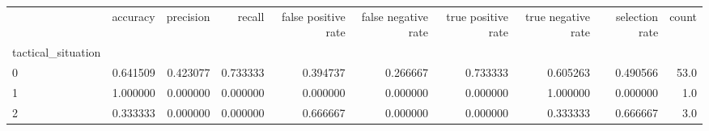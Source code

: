 \begin{tabular}{lrrrrrrrrr}
\toprule
{} &  accuracy &  precision &    recall &  false positive rate &  false negative rate &  true positive rate &  true negative rate &  selection rate &  count \\
tactical\_situation &           &            &           &                      &                      &                     &                     &                 &        \\
\midrule
0                  &  0.641509 &   0.423077 &  0.733333 &             0.394737 &             0.266667 &            0.733333 &            0.605263 &        0.490566 &   53.0 \\
1                  &  1.000000 &   0.000000 &  0.000000 &             0.000000 &             0.000000 &            0.000000 &            1.000000 &        0.000000 &    1.0 \\
2                  &  0.333333 &   0.000000 &  0.000000 &             0.666667 &             0.000000 &            0.000000 &            0.333333 &        0.666667 &    3.0 \\
\bottomrule
\end{tabular}

